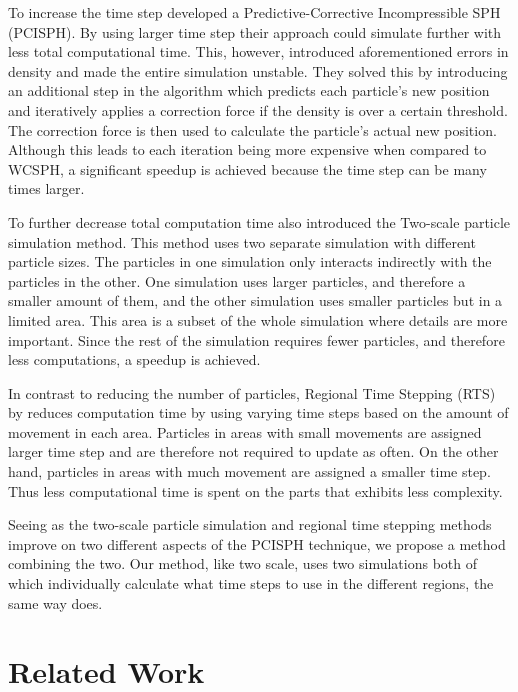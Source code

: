 \documentclass[../../main.tex]{subfiles}
\begin{document}
To increase the time step \citet{solenthaler2009predictive} developed a Predictive-Corrective Incompressible SPH (PCISPH). By using larger time step their approach could simulate further with less total computational time. This, however, introduced aforementioned errors in density and made the entire simulation unstable. They solved this by introducing an additional step in the algorithm which predicts each particle's new position and iteratively applies a correction force if the density is over a certain threshold. The correction force is then used to calculate the particle's actual new position. Although this leads to each iteration being more expensive when compared to WCSPH, a significant speedup is achieved because the time step can be many times larger.

To further decrease total computation time \citet{solenthaler2011two} also introduced the Two-scale particle simulation method. This method uses two separate simulation with different particle sizes. The particles in one simulation only interacts indirectly with the particles in the other. One simulation uses larger particles, and therefore a smaller amount of them, and the other simulation uses smaller particles but in a limited area. This area is a subset of the whole simulation where details are more important. Since the rest of the simulation requires fewer particles, and therefore less computations, a speedup is achieved. 

In contrast to reducing the number of particles, Regional Time Stepping (RTS) by \citet{goswami2014regional} reduces computation time by using varying time steps based on the amount of movement in each area. Particles in areas with small movements are assigned larger time step and are therefore not required to update as often. On the other hand, particles in areas with much movement are assigned a smaller time step. Thus less computational time is spent on the parts that exhibits less complexity.

Seeing as the two-scale particle simulation and regional time stepping methods improve on two different aspects of the PCISPH technique, we propose a method combining the two. Our method, like two scale, uses two simulations both of which individually calculate what time steps to use in the different regions, the same way \citet{goswami2014regional} does.


\section{Related Work}
\end{document}

